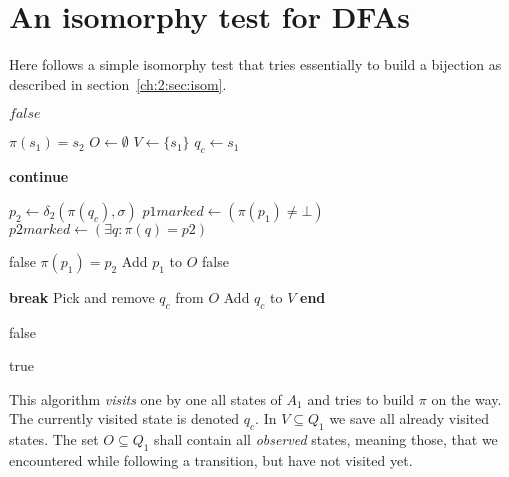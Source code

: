 
\chapter{An isomorphy test for DFAs}\label{ch:app:ism-test}

Here follows a simple isomorphy test that tries essentially to build a bijection as described in section~\ref{ch:2:sec:isom}.
\vspace{0.2cm}
\begin{algorithmic}[1]
			\State \Return $false$
		\EndIf
		
		\State $\pi(s_1) = s_2$ 
		\State $O \gets \emptyset$ 
		\State $V \gets \{s_1\}$ 
		\State $q_c \gets s_1$ 
		
			 
					\State \textbf{continue}
				\EndIf
				
				\State
				
				\State $p_2 \gets \delta_2(\pi(q_c), \sigma)$ 
				\State $p1marked \gets (\pi(p_1) \neq \bot)$ 
				\State $p2marked \gets (\exists q\colon \pi(q)=p2)$
				
				\State
				
						\State \Return false
					\EndIf
					\State $\pi(p_1) = p_2$
					\State Add $p_1$ to $O$
				\EndIf
				\Else {}
					\State \Return false
				\EndIf
			\EndFor	
			
				\State \textbf{break}
			\EndIf
			\State Pick and remove $q_c$ from $O$
			\State Add $q_c$ to $V$
		\EndWhile
		\State\textbf{end}
		
				\State \Return false
			\EndIf
		\EndFor	
		
		\State \Return true
	\EndFunction
\end{algorithmic}
\vspace{0.2cm}
\newpage
\noindent This algorithm \emph{visits} one by one all states of $A_1$ and tries to build $\pi$ on the way. The currently visited state is denoted $q_c$. In $V \subseteq Q_1$ we save all already visited states. The set $O \subseteq Q_1$ shall contain all \emph{observed} states, meaning those, that we encountered while following a transition, but have not visited yet.

